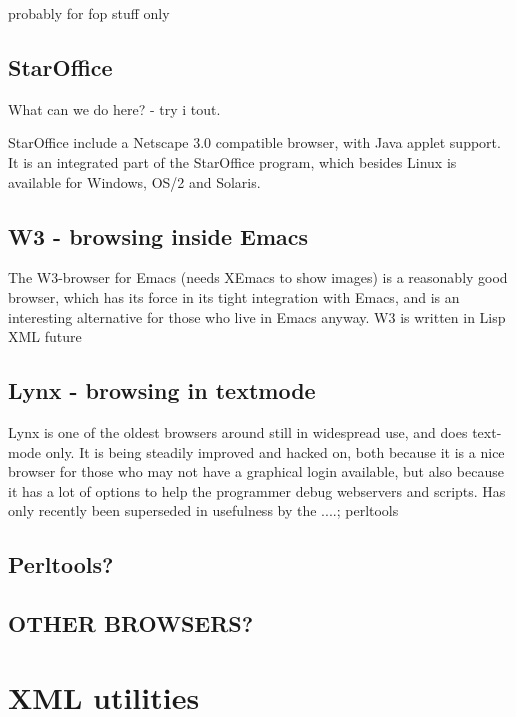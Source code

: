 \textsf{probably for fop stuff only}


\subsection{StarOffice}
\label{sec:staroffice}

\textsf{What can we do here?} - try i tout.

StarOffice include a Netscape \textsf{3.0} compatible browser, with
Java applet support.  It is an integrated part of the StarOffice
program, which besides Linux is available for Windows, OS/2 and
Solaris.



\subsection{W3 - browsing inside Emacs}
\label{sec:w3-browsing-inside-emacs}

The W3-browser for Emacs (needs XEmacs to show images) is a reasonably
good browser, which has its force in its tight integration with
Emacs, and is an interesting alternative for those who live in Emacs
anyway.  W3 is written in Lisp \textsf{XML future}


\subsection{Lynx - browsing in textmode}
\label{sec:lynx-browsing-in-textmode}

Lynx is one of the oldest browsers around still in widespread use, and
does text-mode only.  It is being steadily improved and hacked on,
both because it is a nice browser for those who may not have a
graphical login available, but also because it has a lot of options to
help the programmer debug webservers and scripts.  Has only recently
been superseded in usefulness by the ....; \textsf{perltools}


\subsection{Perltools?}


\subsection{\textsf{OTHER BROWSERS?}}



\section{XML utilities}





